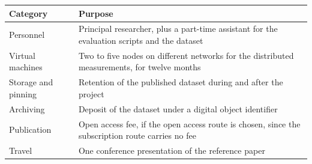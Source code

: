 \documentclass[11pt,a4paper]{article}
\begin{document}
\begin{center}
\begin{tabular}{@{}p{40mm}p{105mm}@{}}
\toprule
Category & Purpose \\
\midrule
Personnel & Principal researcher, plus a part-time assistant for the evaluation scripts and the dataset \\
Virtual machines & Two to five nodes on different networks for the distributed measurements, for twelve months \\
Storage and pinning & Retention of the published dataset during and after the project \\
Archiving & Deposit of the dataset under a digital object identifier \\
Publication & Open access fee, if the open access route is chosen, since the subscription route carries no fee \\
Travel & One conference presentation of the reference paper \\
\bottomrule
\end{tabular}
\end{center}
\end{document}

